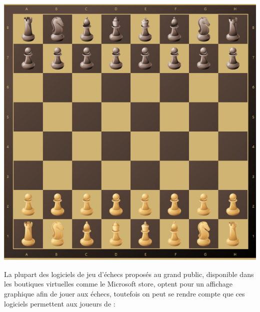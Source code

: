 \documentclass{article}
\begin{document}
\newpage
\centerline{\includegraphics[scale = 0.25]{img/Echiquier.png}}
La plupart des logiciels de jeu d'échecs proposés au grand public, disponible dans les boutiques virtuelles comme le Microsoft store, optent pour un affichage graphique afin de jouer aux échecs, toutefois on peut se rendre compte que ces logiciels permettent aux joueurs de :
\end{document}
